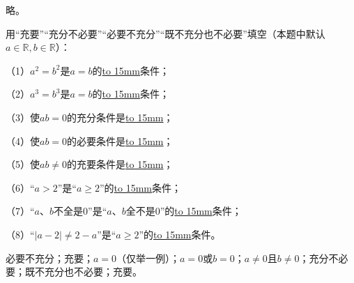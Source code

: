 \documentclass[lang=cn,newtx,10pt,scheme=chinese]{elegantbook}
\begin{document}
\begin{solution}
  略。
\end{solution}
\begin{exercise}\label{BJ4Z_Algebra1_P28.2}
  用“充要”“充分不必要”“必要不充分”“既不充分也不必要”填空（本题中默认$a\in\mathbb{R},b\in\mathbb{R}$）：

  （1）$a^2=b^2$是$a=b$的\underline{\hbox to 15mm{}}条件；

  （2）$a^3=b^3$是$a=b$的\underline{\hbox to 15mm{}}条件；

  （3）使$ab=0$的充分条件是\underline{\hbox to 15mm{}}；

  （4）使$ab=0$的必要条件是\underline{\hbox to 15mm{}}；

  （5）使$ab\neq 0$的充要条件是\underline{\hbox to 15mm{}}；

  （6）“$a>2$”是“$a\geqslant2$”的\underline{\hbox to 15mm{}}条件；

  （7）“$a、b$不全是0”是“$a、b$全不是0”的\underline{\hbox to 15mm{}}条件；

  （8）“$\vert a-2\vert\neq2-a$”是“$a\geqslant2$”的\underline{\hbox to 15mm{}}条件。
\end{exercise}
\begin{solution}
  必要不充分；充要；$a=0$（仅举一例）；$a=0$或$b=0$；$a\neq 0$且$b\neq 0$；充分不必要；既不充分也不必要；充要。
\end{solution}
\end{document}

